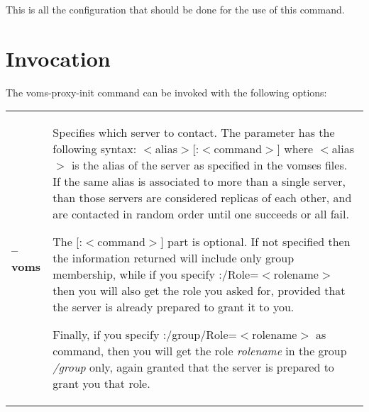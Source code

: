 \documentclass[a4paper]{book}
\begin{document}
This is all the configuration that should be done for the use of this
command.

\section{Invocation}

The voms-proxy-init command can be invoked with the following
options: 

\begin{longtable}{lp{3in}}
\textbf{--voms}     & Specifies which server to contact.  The parameter
                      has the following syntax:
                      $<$alias$>$[:$<$command$>$] where $<$alias$>$ is
                      the alias of the server as specified in the
                      vomses files.  If the same alias is associated
                      to more than a single server, than those servers
                      are considered replicas of each other, and are
                      contacted in random order until one succeeds or
                      all fail. 

		      The [:$<$command$>$] part is optional.  If not
		      specified then the information returned will
		      include only group membership, while if you
		      specify :/Role=$<$rolename$>$ then you will also get the
		      role you asked for, provided that the server is
		      already prepared to grant it to you.  

		      Finally, if you specify
		      :/group/Role=$<$rolename$>$ as command, then you
		      will get the role \emph{rolename} in the group
		      \emph{/group} only, again granted that the
		      server is prepared to grant you that role.


\end{longtable}
\end{document}
